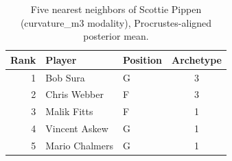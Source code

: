 \begin{table}[htbp]
  \centering\small
  \begin{tabular}{rllc}
    \toprule
    Rank & Player & Position & Archetype \\
    \midrule
    1 & Bob Sura & G & 3 \\
    2 & Chris Webber & F & 3 \\
    3 & Malik Fitts & F & 1 \\
    4 & Vincent Askew & G & 1 \\
    5 & Mario Chalmers & G & 1 \\
    \bottomrule
  \end{tabular}
  \caption{Five nearest neighbors of Scottie Pippen (curvature_m3 modality), Procrustes-aligned posterior mean.}
  \label{tab:Scottie_Pippen_neighbors_curvature_m3}
\end{table}

